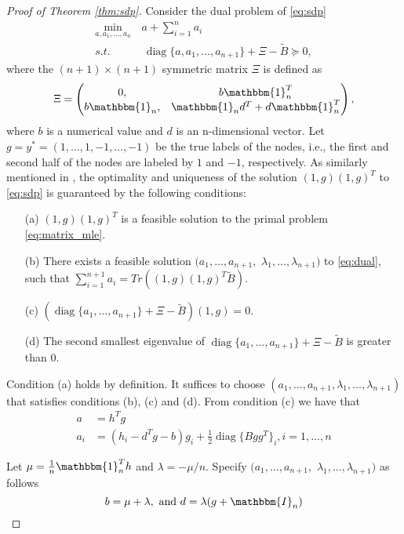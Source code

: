 \documentclass[conference]{IEEEtran}
\DeclareMathOperator{\diag}{diag}
\begin{document}
	\begin{proof}[Proof of Theorem \ref{thm:sdp}]
	Consider the dual problem of \eqref{eq:sdp}
	\begin{align}
		\min_{a, a_1, \dots, a_{n}}\, &a+\sum_{i=1}^{n} a_i \nonumber\\\label{eq:dual}
		s.t. &\, \diag\{a, a_1, \dots, a_{n+1}\} + \Xi - \widetilde{B} \succeq 0, 
	\end{align}
	where the $(n+1)\times (n+1)$ symmetric matrix $\Xi$ is defined as 
	\begin{equation}
		\Xi = \begin{pmatrix}
			0, & b \mathbbm{1}^T_n\\
			b \mathbbm{1}_n, & \mathbbm{1}_n d^T + d \mathbbm{1}^T_n
		\end{pmatrix},
	\end{equation}
    where $b$ is a numerical value and $d$ is an n-dimensional vector.
	Let $g=y^*=(1,\ldots,1,-1,\ldots,-1)$ be the true labels of the nodes, i.e., the first and second half of the nodes are labeled by $1$ and $-1$, respectively. As similarly mentioned in \cite{abbe2015exact},
	the optimality and uniqueness of the solution $(1,g)(1,g)^T$ to \eqref{eq:sdp} is guaranteed by the following conditions: 
	\begin{enumerate}
		\item[(a)] $(1,g)(1,g)^T$ is a feasible solution to the primal problem \eqref{eq:matrix_mle}.
		\item[(b)] There exists a feasible solution $(a_1,\ldots,a_{n+1},$ $\lambda_1,\ldots,\lambda_{n+1})$ to \eqref{eq:dual}, such that $\sum_{i=1}^{n+1} a_i=Tr((1,g)(1,g)^T\widetilde{B})$.
		\item[(c)] $(\diag\{a_1, \dots, a_{n+1}\} + \Xi - \widetilde{B})(1,g)=0$.
		\item[(d)] The second smallest eigenvalue of $\diag\{a_1, \dots, a_{n+1}\} + \Xi - \widetilde{B}$ is greater than $0$. 
	\end{enumerate}
	Condition (a) holds by definition. It suffices to choose $(a_1,\ldots,a_{n+1},\lambda_1,\ldots,\lambda_{n+1})$ that satisfies conditions (b), (c) and (d).
    From condition (c) we have that
	\begin{align}
		a &= h^T g \nonumber\\
		a_{i} & = (h_i - d^Tg - b )g_i + \frac{1}{2}\diag\{Bgg^T\}_i, i = 1, \dots, n
	\end{align}

	Let $\mu=\frac{1}{n}\mathbbm{1}_n^T h$ and $\lambda = -\mu/n$. Specify $(a_1,\ldots,a_{n+1},$ $\lambda_1,\ldots,\lambda_{n+1})$ as follows
	$$
    b =\mu+\lambda, \text{ and }
     d= \lambda (g+ \mathbbm{I}_n)
    $$
	

\end{proof}
\end{document}
